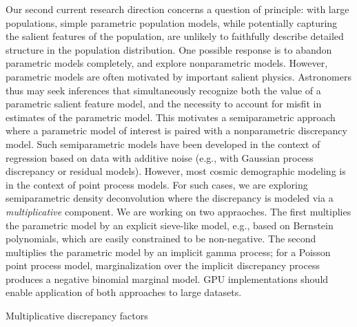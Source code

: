 Our second current research direction concerns a question of principle: with large populations, simple parametric population models, while potentially capturing the salient features of the population, are unlikely to faithfully describe detailed structure in the population distribution.
One possible response is to abandon parametric models completely, and explore nonparametric models.
However, parametric models are often motivated by important salient physics.
Astronomers thus may seek inferences that simultaneously recognize both the value of a parametric salient feature model, and the necessity to account for misfit in estimates of the parametric model.
This motivates a semiparametric approach where a parametric model of interest is paired with a nonparametric discrepancy model.
Such semiparametric models have been developed in the context of regression based on data with additive noise (e.g., with Gaussian process discrepancy or residual models).
However, most cosmic demographic modeling is in the context of point process models.
For such cases, we are exploring semiparametric density deconvolution where the discrepancy is modeled via a \emph{multiplicative} component.
We are working on two appraoches.
The first multiplies the parametric model by an explicit sieve-like model, e.g., based on Bernstein polynomials, which are easily constrained to be non-negative.
The second multiplies the parametric model by an implicit gamma process; for a Poisson point process model, marginalization over the implicit discrepancy process produces a negative binomial marginal model.
GPU implementations should enable application of both approaches to large datasets.

Multiplicative discrepancy factors